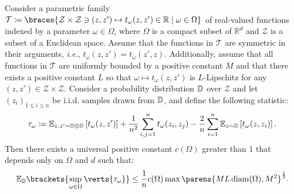 \begin{proposition}\label{lem:u_stat_sup_p_omega}
Consider a parametric family 
	$\mathcal{T}\coloneqq\braces{\mathcal{Z}\times \mathcal{Z}\ni (z,z')\mapsto t_{\omega}(z,z')\in \mathbb{R}\mid\omega \in \Omega}$ 
	of real-valued functions indexed by a parameter $\omega\in \Omega$, where $\Omega$ is a compact subset of $\mathbb{R}^d$ and $\mathcal{Z}$ is a subset of a Euclidean space. Assume that the functions in $\mathcal{T}$ are symmetric in their arguments, \textit{i.e.}, $t_{\omega}(z,z') = t_{\omega}(z',z)$. Additionally, assume that all functions in $\mathcal{T}$ are uniformly bounded by a positive constant $M$ and that there exists a positive constant $L$ so that $\omega \mapsto t_{\omega}(z,z')$ is $L$-Lipschitz for any $(z,z')\in \mathcal{Z}\times\mathcal{Z}$. 
	Consider a probability distribution $\mathbb{D}$ over $\mathcal{Z}$ and let $(z_i)_{1\leq i\leq n}$ be i.i.d. samples drawn from $\mathbb{D}$, and define the following statistic:
\begin{align*}
    \tau_\omega\coloneqq\mathbb{E}_{z,z'\sim\mathbb{D}\otimes\mathbb{D}}\left[t_\omega(z,z')\right]+\frac{1}{n^2}\sum_{i,j=1}^n t_\omega(z_i,z_j)-\frac{2}{n}\sum_{i=1}^n\mathbb{E}_{z\sim\mathbb{D}}\left[t_\omega(z,z_i)\right].
\end{align*}
Then there exists a universal positive constant $c(\Omega)$ greater than $1$ that depends only on $\Omega$ and $d$ such that:
\begin{align*}
	\mathbb{E}_{\PP}\brackets{\sup_{\omega\in \Omega} \verts{\tau_{\omega}}}\leq \frac{1}{n}  c(\Omega)\max\parens{ML\diam(\Omega),M^2}^{\frac{1}{2}}. 
\end{align*}
\end{proposition}

